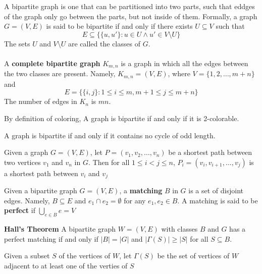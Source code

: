 \documentclass[11pt]{article}
\begin{document}
A bipartite graph is one that can be partitioned into two parts, such that eddges of the graph only go between the parts, but not inside of them. Formally, a graph $G=(V,E)$ is said to be bipartite if and only if there exists $U\subseteq V$ such that
\[
  E\subseteq \{ \{u, u'\}: u\in U \land u'\in V \setminus U\}
\]
The sets $U$ and $V\setminus U$ are called the classes of $G$. \\\\
A \textbf{complete bipartite graph} $K_{m,n}$ is a graph in which all the edges between the two classes are present. Namely, $K_{m,n} = (V,E)$, where $V = \{ 1,2, \dots , m+n\}$ and
\[
  E = \{ \{ i,j\}: 1\leq i \leq m, m+1 \leq j \leq m+n\}
\]
The number of edges in $K_n$ is $mn$.


\begin{proposition*}
  By definition of coloring, A graph is bipartite if and only if it is 2-colorable.
\end{proposition*}

\begin{proposition*}
  A graph is bipartite if and only if it contains no cycle of odd length.
\end{proposition*}

\begin{lemma*}
  Given a graph $G = (V,E)$, let $P=(v_1, v_2, \dots, v_n)$ be a shortest path between two vertices $v_1$ and $v_n$ in $G$. Then for all $1\leq i <j \leq n$, $P_i = (v_i, v_{i+1}, \dots, v_j)$ is a shortest path between $v_i$ and $v_j$
\end{lemma*}

\begin{defn*}
  Given a bipartite graph $G = (V,E)$,  a \textbf{matching} $B$ in $G$ is a set of disjoint edges. Namely, $B\subseteq E$ and $e_1 \cap e_2 = \emptyset$ for any $e_1, e_2 \in B$. A matching is said to be \textbf{perfect} if $\bigcup_{e\in B}e = V$
\end{defn*}

\begin{theorem*}
  \textbf{Hall's Theorem} A bipartite graph $W = (V,E)$ with classes $B$ and $G$ has a perfect matching if and only if $|B|=|G|$ and $|\Gamma(S)| \geq |S|$ for all $S\subseteq B$.
  \begin{rem}
    Given a subset $S$ of the vertices of $W$, let $\Gamma(S)$ be the set of vertices of $W$ adjacent to at least one of the verties of $S$
  \end{rem}
\end{theorem*}
\end{document}
